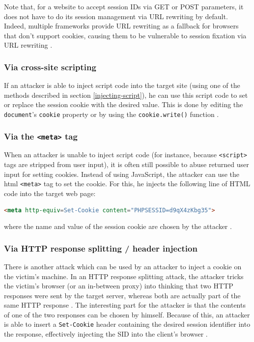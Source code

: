 Note that, for a website to accept session IDs via GET or POST parameters, it does not have to do its session management via URL rewriting by default. Indeed, multiple frameworks provide URL rewriting as a fallback for browsers that don't support cookies, causing them to be vulnerable to session fixation via URL rewriting \cite{PHPURLrewriting,Condit2006,Holovaty2008}.

\subsubsection{Via cross-site scripting}

If an attacker is able to inject script code into the target site (using one of the methods described in section \ref{injecting-script}), he can use this script code to set or replace the \gls{session cookie} with the desired value. This is done by editing the \texttt{document}'s \texttt{cookie} property \cite{Kolsek2002} or by using the \texttt{cookie.write()} function \cite{Johns2011}.

\subsubsection{Via the \texttt{<meta>} tag}

When an attacker is unable to inject script code (for instance, because \texttt{<script>} tags are stripped from user input), it is often still possible to abuse returned user input for setting cookies. Instead of using JavaScript, the attacker can use the \gls{html} \texttt{<meta>} tag to set the cookie. For this, he injects the following line of HTML code into the target web page:
\begin{lstlisting}[language=HTML]
<meta http-equiv=Set-Cookie content="PHPSESSID=d9qX4zKbg35">
\end{lstlisting}
where the name and value of the session cookie are chosen by the attacker \cite{Kolsek2002}.

\subsubsection{Via HTTP response splitting / header injection}\label{splitting}

There is another attack which can be used by an attacker to inject a cookie on the victim's machine. In an HTTP response splitting attack, the attacker tricks the victim's browser (or an in-between proxy) into thinking that two HTTP responses were sent by the target server, whereas both are actually part of the same HTTP response \cite{Klein2004}. The interesting part for the attacker is that the contents of one of the two responses can be chosen by himself. Because of this, an attacker is able to insert a \texttt{Set-Cookie} header containing the desired session identifier into the response, effectively injecting the SID into the client's browser \cite{Johns2011}.

